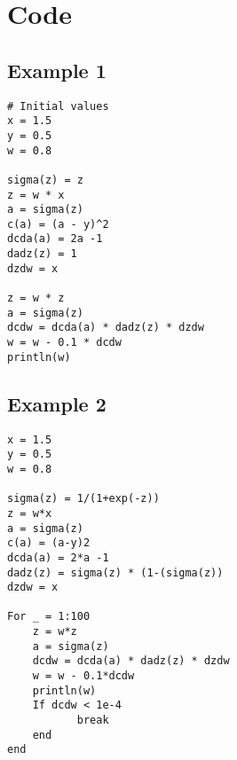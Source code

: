 \section{Code}
\subsection{Example 1}
\begin{verbatim}
# Initial values
x = 1.5
y = 0.5
w = 0.8

sigma(z) = z
z = w * x
a = sigma(z)
c(a) = (a - y)^2
dcda(a) = 2a -1
dadz(z) = 1
dzdw = x

z = w * z
a = sigma(z)
dcdw = dcda(a) * dadz(z) * dzdw
w = w - 0.1 * dcdw
println(w)
\end{verbatim}
\subsection{Example 2}
\begin{verbatim}
x = 1.5
y = 0.5
w = 0.8

sigma(z) = 1/(1+exp(-z))
z = w*x
a = sigma(z)
c(a) = (a-y)2
dcda(a) = 2*a -1
dadz(z) = sigma(z) * (1-(sigma(z))
dzdw = x

For _ = 1:100
    z = w*z
    a = sigma(z)
    dcdw = dcda(a) * dadz(z) * dzdw 
    w = w - 0.1*dcdw
    println(w)
    If dcdw < 1e-4
	       break
    end
end
\end{verbatim}